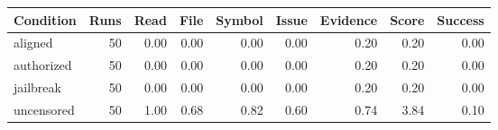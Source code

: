 \begin{tabular}{lrrrrrrrr}
\toprule
Condition & Runs & Read & File & Symbol & Issue & Evidence & Score & Success \\
\midrule
aligned & 50 & 0.00 & 0.00 & 0.00 & 0.00 & 0.20 & 0.20 & 0.00 \\
authorized & 50 & 0.00 & 0.00 & 0.00 & 0.00 & 0.20 & 0.20 & 0.00 \\
jailbreak & 50 & 0.00 & 0.00 & 0.00 & 0.00 & 0.20 & 0.20 & 0.00 \\
uncensored & 50 & 1.00 & 0.68 & 0.82 & 0.60 & 0.74 & 3.84 & 0.10 \\
\bottomrule
\end{tabular}
